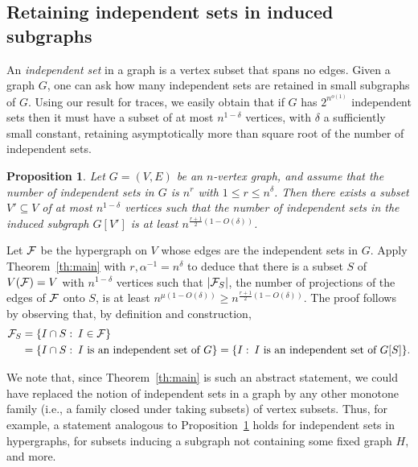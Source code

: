 \documentclass[11pt]{article}
\makeatletter
\renewenvironment{proof}[1][\proofname]
{\par\pushQED{\qed}
	\normalfont\topsep6\p@\@plus6\p@\relax\trivlist
	\item[\hskip\labelsep\bfseries#1\@addpunct{.}]
	\ignorespaces}
{\popQED\endtrivlist\@endpefalse}
\newtheorem{prop}[theo]{Proposition}
\newcommand{\FF}{{\cal F}}
\renewcommand{\a}{\alpha}
\renewcommand{\d}{\delta}
\makeatother
\begin{document}
\subsection{Retaining independent sets in induced subgraphs}\label{subsec:app-graphs}

An \emph{independent set} in a graph is a vertex subset that spans no edges.
Given a graph $G$, one can ask how many independent sets are retained in small subgraphs of $G$. 
Using our result for traces, we easily obtain that if $G$ has $2^{n^{o(1)}}$ independent sets then it must have a subset of at most $n^{1-\d}$ vertices, with $\d$ a sufficiently small constant, retaining asymptotically more than square root of the number of independent sets.

\begin{prop}\label{prop:app-graphs}
	Let $G = (V,E)$ be an $n$-vertex graph, and assume that the number of independent sets in $G$ is $n^r$ with $1 \le r \le n^\d$.
	Then there exists a subset $V' \subseteq V$ of at most $n^{1-\d}$ vertices such that the number of independent sets in the induced subgraph $G[V']$ is at least $n^{\frac{r+1}{2}(1-O(\d))}$.
\end{prop}
\begin{proof}
	Let $\FF$ be the hypergraph on $V$ whose edges are the independent sets in $G$.
	Apply Theorem~\ref{th:main} with $r,\a^{-1} = n^\d$ to deduce that there is a subset $S$ of $V(\FF)=V$ with $n^{1-\d}$ vertices such that $|\FF_S|$, the number of projections of the edges of $\FF$ onto $S$, is at least 
	$n^{\mu(1-O(\d))} \ge n^{\frac{r+1}{2}(1-O(\d))}$.
	The proof follows by observing that, by definition and construction, 
	\begin{align*}
	\FF_S &=\{I \cap S \,\colon\, I \in \FF \} \\ 
	&=\{ I \cap S \,\colon\, I \text{ is an independent set of } G \}
	= \{ I \,\colon\, I \text{ is an independent set of } G[S] \} .
	\end{align*}
\end{proof}

We note that, since Theorem~\ref{th:main} is such an abstract statement, 
we could have replaced the notion of independent sets in a graph 
by any other monotone family (i.e., 
a family closed under taking subsets) of vertex subsets. 
Thus, for example, a statement analogous to 
Proposition~\ref{prop:app-graphs} holds for independent sets in 
hypergraphs, for subsets inducing a subgraph not containing some 
fixed graph $H$, and more.
\end{document}
